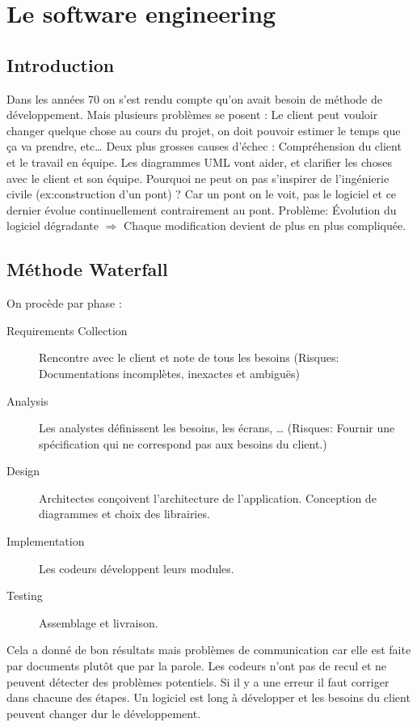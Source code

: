\section{Le software engineering}



\subsection{Introduction}
Dans les années 70 on s’est rendu compte qu’on avait besoin de méthode de développement. Mais plusieurs problèmes se posent : Le client peut vouloir changer quelque chose au cours du projet, on doit pouvoir estimer le temps que ça va prendre, etc…
Deux plus grosses causes d’échec : Compréhension du client et le travail en équipe. Les diagrammes UML vont aider, et clarifier les choses avec le client et son équipe.
Pourquoi ne peut on pas s’inspirer de l'ingénierie civile (ex:construction d’un pont) ? Car un pont on le voit, pas le logiciel et ce dernier évolue continuellement contrairement au pont.
Problème: Évolution du logiciel dégradante $\Rightarrow$ Chaque modification devient de plus en plus compliquée.



\subsection{Méthode Waterfall}
On procède par phase :
\begin{description}
	\item [Requirements Collection] Rencontre avec le client et note de tous les besoins (Risques: Documentations incomplètes, inexactes et ambiguës)
	\item [Analysis] Les analystes définissent les besoins, les écrans, … (Risques: Fournir une spécification qui ne correspond pas aux besoins du client.)
	\item [Design] Architectes conçoivent l’architecture de l’application. Conception de diagrammes et choix des librairies.
	\item [Implementation] Les codeurs développent leurs modules.
	\item [Testing] Assemblage et livraison.
\end{description}

Cela a donné de bon résultats mais problèmes de communication car elle est faite par documents plutôt que par la parole. Les codeurs n’ont pas de recul et ne peuvent détecter des problèmes potentiels. Si il y a une erreur il faut corriger dans chacune des étapes. Un logiciel est long à développer et les besoins du client peuvent changer dur le développement.

